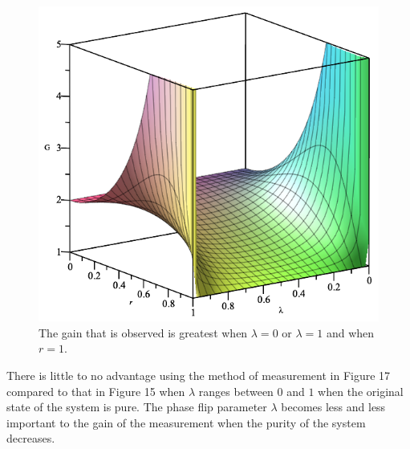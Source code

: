 \documentclass[twocolumn]{article}
\begin{document}
\begin{figure}[h]
\begin{center}
\includegraphics[width=0.65\linewidth]{Phase-Flip-One-Channel-Lambda-and-r-Gain.png}
\caption{The gain that is observed is greatest when $\lambda=0$ or $\lambda=1$ and when $r=1$.}
\end{center}
\end{figure}
\newline
There is little to no advantage using the method of measurement in Figure 17 compared to that in Figure 15 when $\lambda$ ranges between $0$ and $1$ when the original state of the system is pure. The phase flip parameter $\lambda$ becomes less and less important to the gain of the measurement when the purity of the system decreases.
\end{document}
